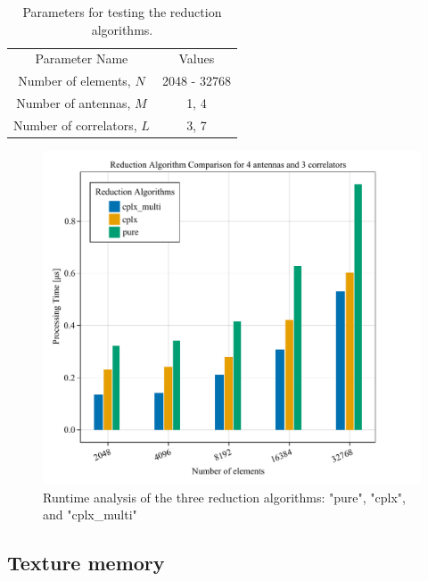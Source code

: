 \documentclass{juliacon}
\begin{document}
\begin{table}
  \centering
  \caption{\label{tab:reduction-params}Parameters for testing the reduction algorithms.}
  \begin{tabular}{cc}
  \multicolumn{1}{c}{Parameter Name} & \multicolumn{1}{c}{Values}  \vspace{2mm}\\ 
  Number of elements, $N$              & 2048 - 32768               \\
  Number of antennas, $M$               & 1, 4                       \\
  Number of correlators, $L$           & 3, 7                   
  \end{tabular}  
\end{table}
\begin{figure}[h]
  \centering
  \includegraphics[scale=0.5]{reduction.pdf}
  \caption{Runtime analysis of the three reduction algorithms: "pure", "cplx", and "cplx\_multi"\label{fig:reduction-plot}}
\end{figure}


\subsection*{Texture memory}
\end{document}
